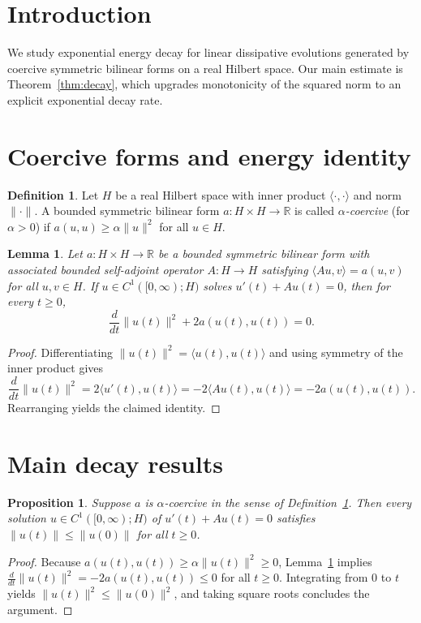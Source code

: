 \documentclass{article}
\newtheorem{lemma}[theorem]{Lemma}
\newtheorem{proposition}[theorem]{Proposition}
\theoremstyle{definition}
\newtheorem{definition}[theorem]{Definition}
\theoremstyle{remark}
\begin{document}
\section{Introduction}
\label{sec:intro}
We study exponential energy decay for linear dissipative evolutions generated
by coercive symmetric bilinear forms on a real Hilbert space. Our main
estimate is Theorem~\ref{thm:decay}, which upgrades monotonicity of the
squared norm to an explicit exponential decay rate.

\section{Coercive forms and energy identity}
\label{sec:prelim}

\begin{definition}
\label{def:coercive}
Let $H$ be a real Hilbert space with inner product $\langle \cdot, \cdot \rangle$
and norm $\|\cdot\|$. A bounded symmetric bilinear form $a : H \times H \to \mathbb{R}$
is called \emph{$\alpha$-coercive} (for $\alpha > 0$) if
$a(u,u) \ge \alpha \|u\|^2$ for all $u \in H$.
\end{definition}

\begin{lemma}
\label{lem:energy}
Let $a : H \times H \to \mathbb{R}$ be a bounded symmetric bilinear form with
associated bounded self-adjoint operator $A : H \to H$ satisfying
$\langle A u, v \rangle = a(u,v)$ for all $u,v \in H$. If
$u \in C^1([0,\infty); H)$ solves $u'(t) + A u(t) = 0$, then for every $t \ge 0$,
\begin{equation}
\label{eq:energy-id}
\frac{d}{dt}\|u(t)\|^2 + 2 a(u(t),u(t)) = 0.
\end{equation}
\end{lemma}
\begin{proof}
Differentiating $\|u(t)\|^2 = \langle u(t), u(t) \rangle$ and using symmetry
of the inner product gives
\[
\frac{d}{dt}\|u(t)\|^2 = 2 \langle u'(t), u(t) \rangle
= -2 \langle A u(t), u(t) \rangle = -2 a(u(t), u(t)).
\]
Rearranging yields the claimed identity.
\end{proof}

\section{Main decay results}
\label{sec:main}

\begin{proposition}
\label{prop:contraction}
Suppose $a$ is $\alpha$-coercive in the sense of Definition~\ref{def:coercive}.
Then every solution $u \in C^1([0,\infty); H)$ of $u'(t) + A u(t) = 0$ satisfies
$\|u(t)\| \le \|u(0)\|$ for all $t \ge 0$.
\end{proposition}
\begin{proof}
Because $a(u(t), u(t)) \ge \alpha \|u(t)\|^2 \ge 0$, Lemma~\ref{lem:energy}
implies $\frac{d}{dt}\|u(t)\|^2 = -2 a(u(t), u(t)) \le 0$ for all $t \ge 0$.
Integrating from $0$ to $t$ yields $\|u(t)\|^2 \le \|u(0)\|^2$, and taking
square roots concludes the argument.
\end{proof}
\end{document}
